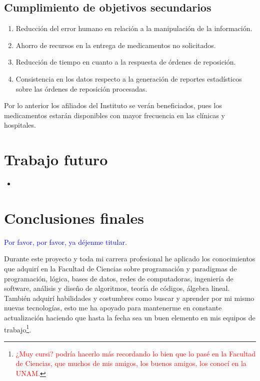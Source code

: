 \subsection{Cumplimiento de objetivos secundarios}

\begin{enumerate}
	\item Reducción del error humano en relación a la manipulación de la información.
	\item Ahorro de recursos en la entrega de medicamentos no solicitados.
	\item Reducción de tiempo en cuanto a la respuesta de órdenes de reposición.
	\item Consistencia en los datos respecto a la generación de reportes estadísticos sobre las órdenes de reposición procesadas.
\end{enumerate}
Por lo anterior los afiliados del Instituto se verán beneficiados, pues los medicamentos estarán disponibles con mayor frecuencia en las clínicas y hospitales.

\section{Trabajo futuro}
\begin{itemize}
	\item 
\end{itemize}

\section{Conclusiones finales}

\textcolor{blue}{Por favor, por favor, ya déjenme titular.}

Durante este proyecto y toda mi carrera profesional he aplicado los conocimientos que adquirí en la Facultad de Ciencias sobre programación y paradigmas de programación, lógica, bases de datos, redes de computadoras, ingeniería de software, análisis y diseño de algoritmos, teoría de códigos, álgebra lineal. También adquirí habilidades y costumbres como buscar y aprender por mi mismo nuevas tecnologías, esto me ha apoyado para mantenerme en constante actualización haciendo que hasta la fecha sea un buen elemento en mis equipos de trabajo\footnote{\textcolor{red}{¿Muy cursi? podría hacerlo más recordando lo bien que lo pasé en la Facultad de Ciencias, que muchos de mis amigos, los buenos amigos, los conocí en la UNAM.}}.
